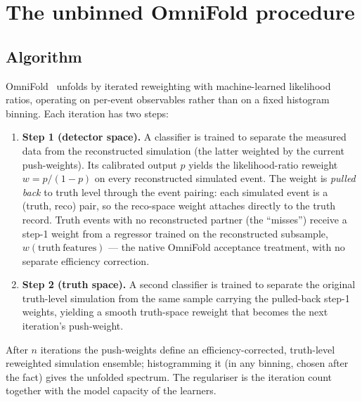 \section{The unbinned OmniFold procedure}
\label{sec:method}

\subsection{Algorithm}
\label{sec:method-algo}

OmniFold~\cite{Andreassen:2019cjw,Andreassen:2021zzk} unfolds by iterated
reweighting with machine-learned likelihood ratios, operating on per-event
observables rather than on a fixed histogram binning. Each iteration has two
steps:
\begin{enumerate}[itemsep=2pt]
  \item \textbf{Step 1 (detector space).} A classifier is trained to separate
        the measured data from the reconstructed simulation (the latter
        weighted by the current push-weights). Its calibrated output $p$
        yields the likelihood-ratio reweight $w = p/(1-p)$ on every
        reconstructed simulated event. The weight is \emph{pulled back} to
        truth level through the event pairing: each simulated event is a
        (truth, reco) pair, so the reco-space weight attaches directly to the
        truth record. Truth events with no reconstructed partner (the
        ``misses'') receive a step-1 weight from a regressor trained on the
        reconstructed subsample, $w(\mathrm{truth\ features})$ --- the native
        OmniFold acceptance treatment, with no separate efficiency
        correction.
  \item \textbf{Step 2 (truth space).} A second classifier is trained to
        separate the original truth-level simulation from the same sample
        carrying the pulled-back step-1 weights, yielding a smooth truth-space
        reweight that becomes the next iteration's push-weight.
\end{enumerate}
After $n$ iterations the push-weights define an efficiency-corrected,
truth-level reweighted simulation ensemble; histogramming it (in any binning,
chosen after the fact) gives the unfolded spectrum. The regulariser is the
iteration count together with the model capacity of the learners.

